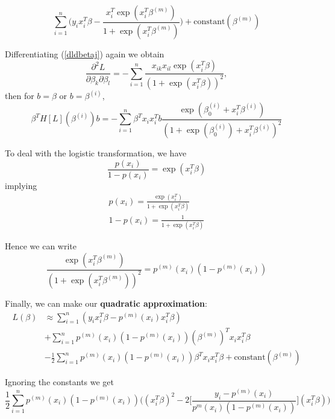 \documentclass[11pt]{article}
\theoremstyle{definition}
\numberwithin{equation}{section}
\begin{document}
\begin{equation}
  \sum^n_{i=1}\Bigg( y_ix_i^T\beta - \frac{x_i^T\exp(x_i^T\beta^{(m)})}{1+\exp(x_i^T\beta^{(m)})} \Bigg) + \text{constant}(\beta^{(m)})
\end{equation}

Differentiating (\ref{dldbetaj}) again we obtain
\begin{equation}
  \frac{\partial^2L}{\partial\beta_k\partial\beta_l}=-\sum^n_{i=1}\frac{x_{ik}x_{il}\exp(x_i^T\beta)}{(1+\exp(x_i^T\beta))^2},
\end{equation}
then for $b=\beta$ or $b=\beta^{(i)}$,
\begin{equation}
  \beta^TH[L](\beta^{(i)})b=-\sum^n_{i=1}\beta^Tx_ix_i^Tb\frac{\exp(\beta_0^{(i)} + x_i^T\beta^{(i)})}{(1+\exp(\beta_0^{(i)})+x_i^T\beta^{(i)})^2}
\end{equation}

To deal with the logistic transformation, we have
\begin{equation}
  \frac{p(x_i)}{1 - p(x_i)}=\exp(x_i^T\beta)
\end{equation}
implying
\begin{gather}
  p(x_i)=\frac{\exp(x_i^T)}{1+\exp(x_i^T\beta)}\\
  1 - p(x_i) =\frac{1}{1 + \exp(x_i^T\beta)}
\end{gather}

Hence we can write
\begin{equation}
  \frac{\exp(x_i^T\beta^{(m)})}{(1+\exp(x_i^T\beta^{(m)}))^2}=p^{(m)}(x_i)(1-p^{(m)}(x_i))
\end{equation}

Finally, we can make our \textbf{quadratic approximation}:
\begin{align}
  L(\beta)&\approx \sum^n_{i=1} (y_ix_i^T\beta-p^{(m)}(x_i)x_i^T\beta)\label{quad-approx-no-penalty}\\
  &+ \sum^n_{i=1}p^{(m)}(x_i)(1-p^{(m)}(x_i))(\beta^{(m)})^Tx_ix_i^T\beta \\
  &- \frac{1}{2}\sum^n_{i=1}p^{(m)}(x_i)(1-p^{(m)}(x_i))\beta^Tx_ix_i^T\beta + \text{constant}(\beta^{(m)})
\end{align}

Ignoring the constants we get
\begin{equation}\label{quadapprox}
 \frac{1}{2}\sum^n_{i=1}p^{(m)}(x_i)(1-p^{(m)}(x_i))\Bigg( (x_i^T\beta)^2-2 \Bigg[ \frac{y_i-p^{(m)} (x_i)}{p^{m}(x_i)(1-p^{(m)}(x_i))} \Bigg](x_i^T\beta)\Bigg)
\end{equation}
\end{document}
